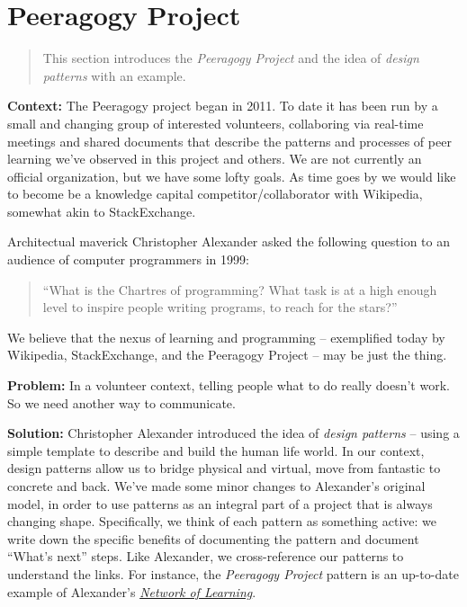 \section{Peeragogy Project}

\begin{quote}
This section introduces the \emph{Peeragogy Project} and the idea of \emph{design patterns} with an example.
\end{quote}

\textbf{Context:}  The Peeragogy project began in 2011.  To date it has been run by a small and changing group of interested volunteers, collaboring via real-time meetings and shared documents that describe the patterns and processes of peer learning we've observed in this project and others.   We are not currently an official organization, but we have some lofty goals.  As time goes by we would like to become be a knowledge capital competitor/collaborator with Wikipedia, somewhat akin to StackExchange.

Architectual maverick Christopher Alexander asked the following question to an audience of computer programmers in 1999: 
\begin{quote}
``What is the Chartres of programming? What task is at a high enough level to inspire people writing programs, to reach for the stars?''
\end{quote}
We believe that the nexus of learning and programming -- exemplified today by Wikipedia, StackExchange, and the Peeragogy Project -- may be just the thing.

\textbf{Problem:} In a volunteer context, telling people what to do really doesn't work.  So we need another way to communicate.

\textbf{Solution:} Christopher Alexander introduced the idea of \emph{design patterns} -- using a simple template to describe and build the human life world.  In our context, design patterns allow us to bridge physical and virtual, move from fantastic to concrete and back.  We've made some minor changes to Alexander's original model, in order to use patterns as an integral part of a project that is always changing shape.  Specifically, we think of each pattern as something active: we write down the specific benefits of documenting the pattern and document ``What's next'' steps.  Like Alexander, we cross-reference our patterns to understand the links.  For instance, the \emph{Peeragogy Project} pattern is an up-to-date example of Alexander's \href{http://en.wikipedia.org/wiki/Networked_learning#1970s}{\emph{Network of Learning}}.


